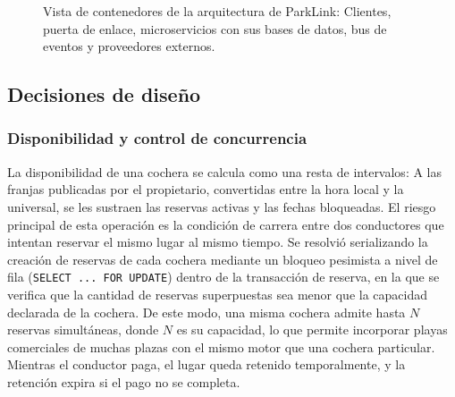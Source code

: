 \documentclass[conference,a4paper]{IEEEtran}
\begin{document}
\begin{figure}[!t]
{}
\caption{Vista de contenedores de la arquitectura de ParkLink: Clientes, puerta de enlace, microservicios con sus bases de datos, bus de eventos y proveedores externos.}
\label{fig:arquitectura}
\end{figure}

\subsection{Decisiones de diseño}

\subsubsection{Disponibilidad y control de concurrencia}
La disponibilidad de una cochera se calcula como una resta de intervalos: A las franjas publicadas por el propietario, convertidas entre la hora local y la universal, se les sustraen las reservas activas y las fechas bloqueadas. El riesgo principal de esta operación es la condición de carrera entre dos conductores que intentan reservar el mismo lugar al mismo tiempo. Se resolvió serializando la creación de reservas de cada cochera mediante un bloqueo pesimista a nivel de fila (\texttt{SELECT ... FOR UPDATE}) dentro de la transacción de reserva, en la que se verifica que la cantidad de reservas superpuestas sea menor que la capacidad declarada de la cochera. De este modo, una misma cochera admite hasta $N$ reservas simultáneas, donde $N$ es su capacidad, lo que permite incorporar playas comerciales de muchas plazas con el mismo motor que una cochera particular. Mientras el conductor paga, el lugar queda retenido temporalmente, y la retención expira si el pago no se completa.
\end{document}
